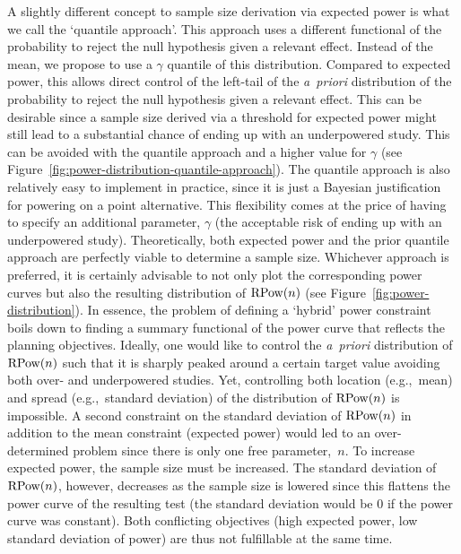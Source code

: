 \documentclass{article}
\begin{document}
A slightly different concept to sample size derivation via expected power is what we call the `quantile approach'.
This approach uses a different functional of the probability to reject the null hypothesis given a relevant effect.
Instead of the mean, we propose to use a $\gamma$ quantile of this distribution.
Compared to expected power, this allows direct control of
the left-tail of the \textit{a~priori} distribution of the probability to reject the null hypothesis given a relevant effect.
This can be desirable since a sample size derived via a threshold for expected power might still lead to a substantial chance of ending up with an underpowered study.
This can be avoided with the quantile approach and a higher value for $\gamma$ (see Figure~\ref{fig:power-distribution-quantile-approach}).
The quantile approach is also relatively easy to implement in practice, since it is just a Bayesian justification for powering on a point alternative.
This flexibility comes at the price of having to specify an additional parameter, $\gamma$ (the acceptable risk of ending up with an underpowered study).
Theoretically, both expected power and the prior quantile approach are perfectly viable to determine a sample size.
Whichever approach is preferred, it is certainly advisable to
not only plot the corresponding power curves but also the resulting distribution of $\operatorname{RPow}({ n })$ (see Figure~\ref{fig:power-distribution}).
In essence, the problem of defining a `hybrid' power constraint boils down to finding a summary functional of the power curve that reflects the planning objectives.
Ideally, one would like to control the \textit{a~priori} distribution of $\operatorname{RPow}({ n })$ such that it is sharply peaked around a certain target value avoiding both over- and underpowered studies.
Yet, controlling both location (e.g.,~mean) and spread (e.g.,~standard deviation) of the distribution of $\operatorname{RPow}({ n })$ is
impossible.
A second constraint on the standard deviation of $\operatorname{RPow}({ n })$
in addition to the mean constraint (expected power)
would led to an over-determined problem since there is only one free parameter,~$n$.
To increase expected power, the sample size must be increased.
The standard deviation of $\operatorname{RPow}({ n })$, however, decreases as the sample size is lowered since this flattens the power curve of the resulting test (the standard deviation would be 0 if the power curve was constant).
Both conflicting objectives (high expected power, low standard deviation of power) are thus not fulfillable at the same time.
\end{document}
